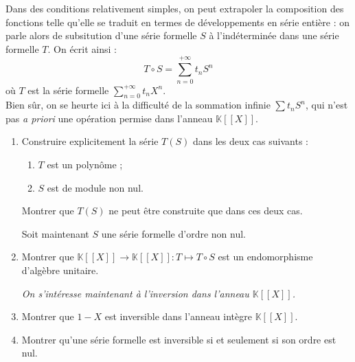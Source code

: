 \begin{exer}
Dans des conditions relativement simples, %
on peut extrapoler la composition des fonctions telle qu'elle se traduit en termes de développements en série entière : %
on parle alors de subsitution d'une s\'erie formelle $S$ \`a l'ind\'etermin\'ee dans une s\'erie formelle $T$. On écrit ainsi :
\[T \circ S = \sum\limits_{n=0}^{+ \infty} t_n S^n\]
o\`u $T$ est la s\'erie formelle $\sum\limits_{n=0}^{+\infty}t_n X^n$.\\
Bien s\^ur, on se heurte ici \`a la difficulté de la sommation infinie $\sum t_n S^n$, %
qui n'est pas \textit{a priori} une opération permise dans l'anneau $\mathbb{K}[[X]]$.
\begin{enumerate}
\item Construire explicitement la s\'erie $T(S)$ dans les deux cas suivants :
\begin{enumerate}
\item $T$ est un polyn\^ome ;
\item $S$ est de module non nul. %
\end{enumerate}

Montrer que $T(S)$ ne peut \^etre construite que dans ces deux cas.

\medskip
Soit maintenant $S$ une série formelle d'ordre non nul. %
\item Montrer que \mbox{$\mathbb{K}[[X]] \rightarrow \mathbb{K}[[X]] : T \mapsto T \circ S$} est un endomorphisme d'algèbre unitaire.
%

\medskip
\textit{On s'int\'eresse maintenant \`a l'inversion dans l'anneau $\mathbb{K}[[X]]$.}
\item Montrer que $1-X$ est inversible dans l'anneau intègre $\mathbb{K}[[X]]$.
\item Montrer qu'une série formelle est inversible si et seulement si son ordre est nul.
\end{enumerate}
\end{exer}

